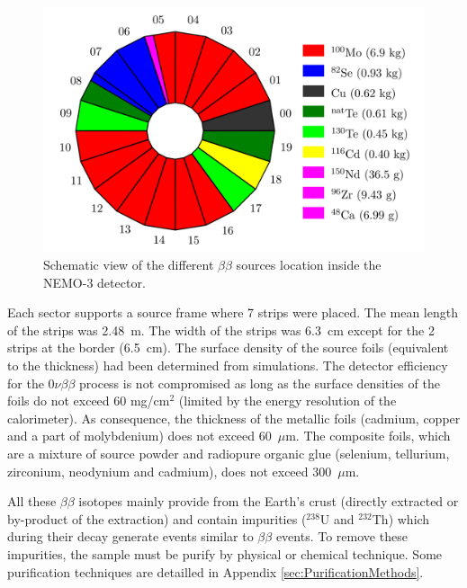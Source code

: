 \documentclass[main.tex]{subfiles}
\begin{document}
\begin{figure}[h!]
\begin{center}
\includegraphics[scale=0.46]{pictures/Chap3/BBSourceDistribution.png}
\caption{Schematic view of the different $\beta\beta$ sources location inside the NEMO-3 detector.}
\label{NEMO3Sector}
\end{center}
\end{figure}


\FloatBarrier


\NI Each sector supports a source frame where 7 strips were placed. The mean length of the strips was 2.48~m. The width of the strips was 6.3~cm except for the 2 strips at the border (6.5~cm). The surface density of the source foils (equivalent to the thickness) had been determined from simulations. The detector efficiency for the 0$\nu\beta\beta$ process is not compromised
as long as the surface densities of the foils do not exceed 60 mg/cm$^\text{2}$ (limited by the energy resolution of the calorimeter). As consequence, the thickness of the metallic foils (cadmium, copper and a part of molybdenium) does not exceed 60~$\mu$m. The composite foils, which are a mixture of source powder and radiopure organic glue (selenium, tellurium, zirconium, neodynium and cadmium), does not exceed 300~$\mu$m. 


\bigskip


\NI All these $\beta\beta$ isotopes mainly provide from the Earth's crust (directly extracted or by-product of the extraction) and contain impurities ($^{\text{238}}$U and $^{\text{232}}$Th) which during their decay generate events similar to $\beta\beta$ events. To remove these impurities, the sample must be purify by physical or chemical technique. Some purification techniques are detailled in Appendix \ref{sec:PurificationMethods}.
\end{document}
